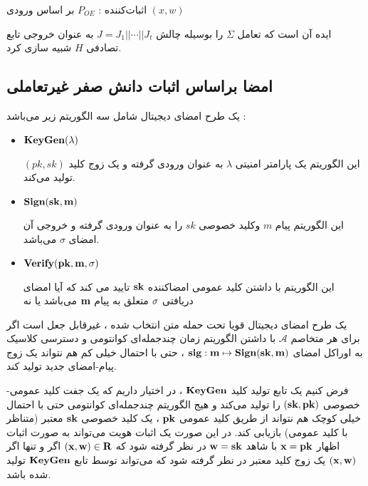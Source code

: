 \documentclass[12pt,a4paper]{article}
\begin{document}
\begin{algorithm}\label{algorithm_1}
	\caption{
اثبات‌کننده :
$P_{OE}$
بر اساس ورودی
$(x,w)$	
}
	\resetlatinfont
	\begin{algorithmic}[1]
		\EndFor
	\end{algorithmic}
\end{algorithm}


ایده آن است که تعامل 
$\Sigma$
را بوسیله چالش 
$J = J_1 || \cdots || J_t $
به عنوان خروجی تابع تصادفی 
$H$
شبیه سازی کرد.


\subsection{امضا براساس اثبات دانش صفر غیرتعاملی }\label{sign_from_nzkp}

یک طرح امضای دیجیتال شامل سه الگوریتم زیر می‌باشد :
\begin{itemize}
	\item{
		$\bf KeyGen(\lambda)$
	}
		
	این الگوریتم یک پارامتر امنیتی 
	$\lambda$
	به عنوان ورودی گرفته و یک زوج کلید 
	$(pk,sk)$
	تولید می‌کند.
	\item {
	$\bf Sign(sk,m)$	
}

این الگوریتم پیام
$m$
وکلید خصوصی
$sk$
را به عنوان ورودی گرفته و خروجی آن امضای 
$\sigma$
می‌باشد.
\item{
$\bf Verify(pk,m,\sigma)$
}

این الگوریتم با داشتن کلید عمومی امضاکننده 
$\bf sk $
تایید می کند که آیا امضای دریافتی 
$\bf \sigma $
متعلق به پیام 
$\bf m $
می‌باشد یا نه
\end{itemize}

یک طرح امضای دیجیتال قویا تحت حمله متن انتخاب شده
، غیرقابل جعل 
است اگر برای هر متخاصم
$\mathcal{A}$
با داشتن الگوریتم زمان چندجمله‌ای کوانتومی و دسترسی کلاسیک به اوراکل امضای 
$\bf sig : m \mapsto Sign(sk,m)$
، حتی با احتمال خیلی کم هم نتواند یک زوج پیام-امضای جدید تولید کند.

فرض ‌کنیم یک تابع تولید کلید 
$\bf KeyGen$
، در اختیار داریم که یک جفت کلید عمومی-خصوصی
$\bf (sk,pk)$
را تولید می‌کند و هیج الگوریتم چندجمله‌ای کوانتومی حتی با احتمال خیلی کوچک  هم نتواند از طریق کلید عمومی
$\bf pk$
، یک کلید خصوصی
$\bf sk$
معتبر (متناظر با کلید عمومی) بازیابی کند. در این صورت یک اثبات هویت می‌تواند به صورت اثبات اظهار 
$\bf x=pk$
با شاهد 
$\bf w = sk$
در نظر گرفته شود که 
$\bf (x,w) \in R$
اگر و تنها اگر
$\bf (x,w)$
یک زوج کلید معتبر در نطر گرفته شود که می‌تواند توسط تابع 
$\bf KeyGen$
تولید شده باشد.	
\end{document}
